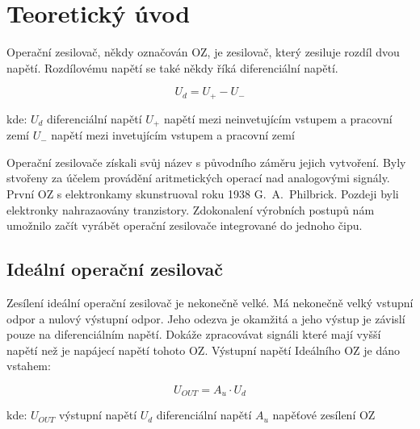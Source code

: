\section{Teoretický úvod}
  \indent\indent
  Operační zesilovač, někdy označován OZ, je zesilovač, který zesiluje rozdíl dvou napětí. Rozdílovému napětí se také někdy říká diferenciální napětí.
  
  \begin{equation}
  	U_d = U_+ - U_-
  \end{equation}
  
  \hspace*{2cm}kde:\newline    
  \hspace*{4cm}$U_{d}$ \dotfill diferenciální napětí\hspace*{4cm}\newline
  \hspace*{4cm}$U_+$ \dotfill napětí mezi neinvetujícím vstupem a pracovní zemí\hspace*{4cm}\newline
  \hspace*{4cm}$U_-$ \dotfill napětí mezi invetujícím vstupem a pracovní zemí\hspace*{4cm}\newline
  
  Operační zesilovače získali svůj název s původního záměru jejich vytvoření. Byly stvořeny za účelem provádění aritmetických operací nad analogovými signály. První OZ s elektronkamy skunstruoval roku 1938 G.~A.~Philbrick. Pozdeji byli elektronky nahrazaovány tranzistory. Zdokonalení výrobních postupů nám umožnilo začít vyrábět operační zesilovače integrované do jednoho čipu.
  
  \subsection{Ideální operační zesilovač}
  	\indent\indent	
  	Zesílení ideální operační zesilovač je nekonečně velké. Má nekonečně velký vstupní odpor a nulový výstupní odpor. Jeho odezva je okamžitá a jeho výstup je závislí pouze na diferenciálním napětí. Dokáže zpracovávat signáli které mají vyšší napětí než je napájecí napětí tohoto OZ. Výstupní napětí Ideálního OZ je dáno vstahem:  	
  	
		\begin{equation}
			U_{OUT} = A_u\cdot U_d
		\end{equation}
		
		\hspace*{2cm}kde:\newline    
    \hspace*{4cm}$U_{OUT}$ \dotfill výstupní napětí\hspace*{4cm}\newline
    \hspace*{4cm}$U_d$ \dotfill diferenciální napětí\hspace*{4cm}\newline
    \hspace*{4cm}$A_u$ \dotfill napěťové zesílení OZ\hspace*{4cm}\newline
	  
